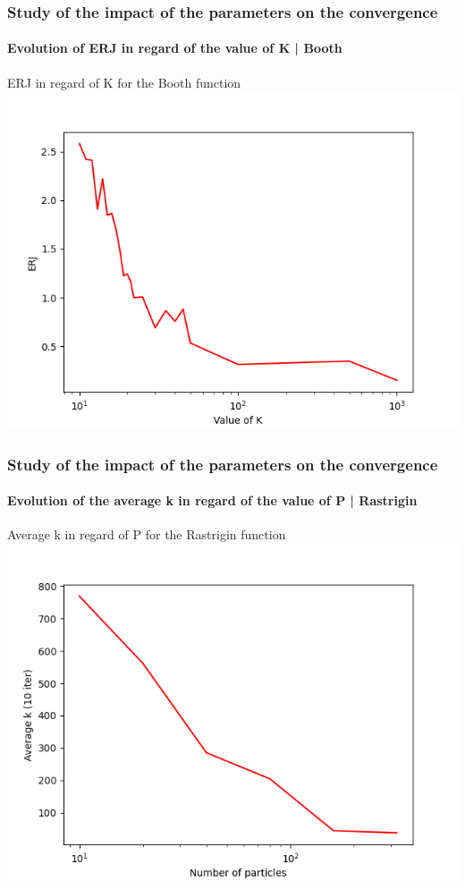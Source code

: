 \documentclass{beamer}
\begin{document}
	\begin{frame}
	\frametitle{\color{velvet} Study of the impact of the parameters on the convergence}
	\framesubtitle{Evolution of ERJ in regard of the value of K | Booth}
	ERJ in regard of K for the Booth function
	\includegraphics[scale=0.5]{Graphs/8.png}
	\end{frame}
	\begin{frame}
	\frametitle{\color{velvet} Study of the impact of the parameters on the convergence}
	\framesubtitle{Evolution of the average k in regard of the value of P | Rastrigin}
	Average k in regard of P for the Rastrigin function
	\includegraphics[scale=0.5]{Graphs/9.png}
	\end{frame}
\end{document}
